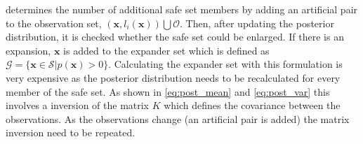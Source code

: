 \documentclass{ifacconf}
\newcommand{\bx}{\bm{x}}
\begin{document}
determines the number of additional safe set members by adding an artificial pair to the observation set, \((\bx, l_i(\bx)) \bigcup \mathcal{O}\). Then, after updating the posterior distribution, it is checked whether the safe set could be enlarged. If there is an expansion, \(\bx\) is added to the expander set which is defined as \(\mathcal{G}=\{\bx\in \mathcal{S}\vert p(\bx) > 0\}\).
Calculating the expander set with this formulation is very expensive as the posterior distribution needs to be recalculated for every member of the safe set. As shown in \eqref{eq:post_mean} and \eqref{eq:post_var} this involves a inversion of the matrix \(K\) which defines the covariance between the observations. As the observations change (an artificial pair is added) the matrix inversion need to be repeated.

\end{document}
